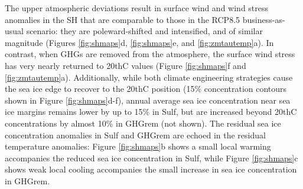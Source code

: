 \documentclass{nature}
\begin{document}
The upper atmospheric deviations result in surface wind and wind stress anomalies in the SH that are comparable to those in the RCP8.5 business-as-usual scenario: they are poleward-shifted and intensified, and of similar magnitude (Figures \ref{fig:shmaps}d, \ref{fig:shmaps}e, and \ref{fig:zmtautemp}a). In contrast, when GHGs are removed from the atmosphere, the surface wind stress has very nearly returned to 20thC values (Figure \ref{fig:shmaps}f and \ref{fig:zmtautemp}a). Additionally, while both climate engineering strategies cause the sea ice edge to recover to the 20thC position (15\% concentration contours shown in Figure \ref{fig:shmaps}d-f), annual average sea ice concentration near sea ice margins remains lower by up to 15\% in Sulf, but are increased beyond 20thC concentrations by almost 10\% in GHGrem (not shown). The residual sea ice concentration anomalies in Sulf and GHGrem are echoed in the residual temperature anomalies: Figure \ref{fig:shmaps}b shows a small local warming accompanies the reduced sea ice concentration in Sulf, while Figure \ref{fig:shmaps}c shows weak local cooling accompanies the small increase in sea ice concentration in  GHGrem. %
\end{document}
